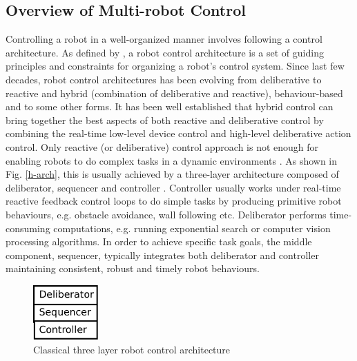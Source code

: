 \documentclass{ifacconf}
\begin{document}
\subsection{Overview of Multi-robot Control}
Controlling a robot in a well-organized manner involves following a control architecture. As defined by \cite{Mataric2008}, a robot control architecture is a set of guiding principles and constraints for organizing a robot's control system. Since last few decades, robot control architectures has been evolving from deliberative to reactive and hybrid (combination of deliberative and reactive), behaviour-based and to some other forms. It has been well established that hybrid control can bring together the best aspects of both reactive and deliberative control by combining the real-time low-level device control and high-level deliberative action control. Only reactive (or deliberative) control approach  is not enough for enabling robots to do complex tasks in a dynamic environments \cite{Gat1997}. As shown in Fig. \ref{h-arch}, this is usually achieved by a three-layer architecture composed of deliberator, sequencer and controller . Controller usually works under real-time reactive feedback control loops to do simple tasks by producing primitive robot behaviours, e.g.  obstacle avoidance, wall following etc. Deliberator performs time-consuming computations, e.g. running exponential search or computer vision processing algorithms. In order to achieve specific task goals, the middle component, sequencer, typically integrates both deliberator and controller maintaining consistent, robust and timely robot behaviours.
\begin{figure}
\begin{center}
\includegraphics[width=2.5cm,height=2.1cm]{./dia-files/three-layer-arch}    %
\caption{Classical three layer robot control architecture \cite{Gat1997}} 
\label{fig:abstract-arch}
\end{center}
\end{figure}
\end{document}
